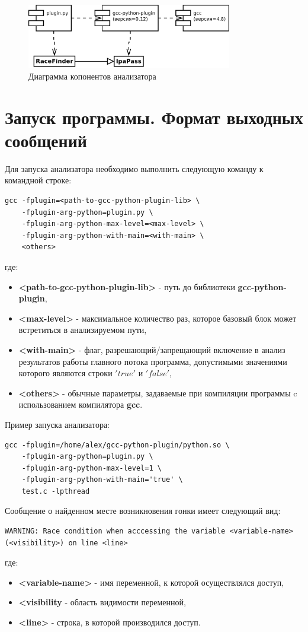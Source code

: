 \begin{figure}
  \centering
  \includegraphics[width=0.8\textwidth]{inc/dia/components}
  \caption{Диаграмма копонентов анализатора}
  \label{fig:components}
\end{figure}

\section{Запуск программы. Формат выходных сообщений}

Для запуска анализатора необходимо выполнить следующую команду к командной строке:
\begin{verbatim}
gcc -fplugin=<path-to-gcc-python-plugin-lib> \
    -fplugin-arg-python=plugin.py \
    -fplugin-arg-python-max-level=<max-level> \
    -fplugin-arg-python-with-main=<with-main> \
    <others>
\end{verbatim}
где:
\begin{itemize}
  \item \textbf{<path-to-gcc-python-plugin-lib>} - путь до библиотеки \textbf{gcc-python-plugin},
  \item \textbf{<max-level>} - максимальное количество раз, которое базовый блок может встретиться в анализируемом пути,
  \item \textbf{<with-main>} - флаг, разрешающий/запрещающий включение в анализ результатов работы главного потока программа, допустимыми значениями которого являются строки $'true'$ и $'false'$,
  \item \textbf{<others>} - обычные параметры, задаваемые при компиляции программы c использованием компилятора \textbf{gcc}.
\end{itemize}

Пример запуска анализатора:
\begin{verbatim}
gcc -fplugin=/home/alex/gcc-python-plugin/python.so \
    -fplugin-arg-python=plugin.py \
    -fplugin-arg-python-max-level=1 \
    -fplugin-arg-python-with-main='true' \
    test.c -lpthread
\end{verbatim}

Сообщение о найденном месте возникновения гонки имеет следующий вид:
\begin{verbatim}
WARNING: Race condition when acccessing the variable <variable-name> (<visibility>) on line <line>
\end{verbatim}
где:
\begin{itemize}
  \item \textbf{<variable-name>} - имя переменной, к которой осуществлялся доступ,
  \item \textbf{<visibility} - область видимости переменной,
  \item \textbf{<line>} - строка, в которой производился доступ.
\end{itemize}

